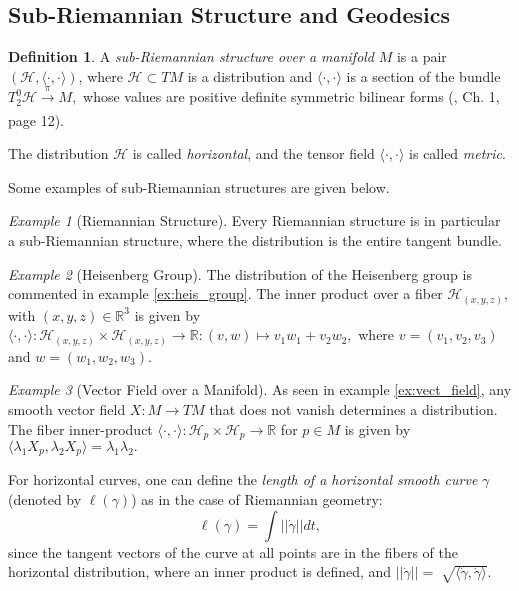 \documentclass[12pt, letterpaper, reqno]{amsart}
\theoremstyle{definition}
\newtheorem{df}{Definition}
\theoremstyle{plain}
\theoremstyle{remark}
\newtheorem{ex}{Example}
\begin{document}
\subsection{Sub-Riemannian Structure and Geodesics}%
\label{sub:sub-Riemannian_structure_and_geodesics}
\begin{df}
	A \textit{sub-Riemannian structure over a manifold} $ M $ is a pair $ (\mathcal{H}, \langle\cdot,\cdot\rangle)$, where $ \mathcal{H}\subset TM $ is a distribution and $ \langle\cdot,\cdot\rangle $ is a section of the bundle $ T^0_2 \mathcal{H} \xrightarrow[]{\pi} M, $ whose values are positive definite symmetric bilinear forms (\cite{hatcher2003vector}, Ch. 1, page 12).

	The distribution $ \mathcal{H} $ is called \textit{horizontal}, and the tensor field $ \langle\cdot,\cdot\rangle $ is called \textit{metric}.  
\end{df}

Some examples of sub-Riemannian structures are given below.
\begin{ex}[Riemannian Structure]\label{ex:riem_geo2}
	Every Riemannian structure is in particular a sub-Riemannian structure, where the distribution is the entire tangent bundle.
\end{ex}

\begin{ex}[Heisenberg Group]\label{ex:heis_group2}
	The distribution of the Heisenberg group is commented in example \ref{ex:heis_group}. The inner product over a fiber $ \mathcal{H}_{(x,y,z)} $, with $ (x,y,z)\in \mathbb{R}^3 $  is given by $\langle\cdot,\cdot\rangle:  \mathcal{H}_{(x,y,z)}\times\mathcal{H}_{(x,y,z)} \rightarrow { \mathbb{R} }:(v,w)\mapsto v_1w_1+v_2w_2,$ where $ v=(v_1,v_2,v_3) $ and $ w=(w_1,w_2,w_3). $  

\end{ex}
\begin{ex}[Vector Field over a Manifold]\label{ex:vect_field2}
	As seen in example \ref{ex:vect_field}, any smooth vector field $ X: M \rightarrow TM$ that does not vanish determines a distribution.  The fiber inner-product $ \langle\cdot,\cdot\rangle: \mathcal{H}_p \times \mathcal{H}_p \rightarrow \mathbb{R} $ for $ p\in M $  is given by $\langle\lambda_1 X_p,\lambda_2 X_p\rangle=\lambda_1 \lambda_2.$
\end{ex}
For horizontal curves, one can define the \textit{length of a horizontal smooth curve} $ \gamma $ (denoted by $ \ell(\gamma) $) as in the case of Riemannian geometry:
$$ \ell(\gamma) = \int ||\dot{\gamma}|| dt, $$ 
since the tangent vectors of the curve at all points are in the fibers of the horizontal distribution, where an inner product is defined, and $ ||\dot{\gamma}||= \sqrt[]{\langle\dot{\gamma}, \dot{\gamma}\rangle}.  $   
\end{document}
